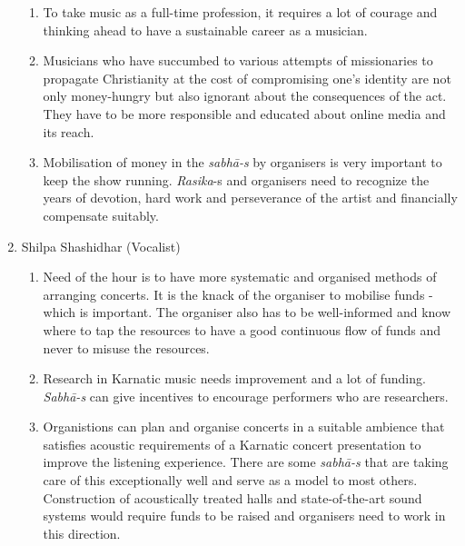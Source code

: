 \begin{enumerate}
\begin{enumerate}
 \item To take music as a full-time profession, it requires a lot of courage and thinking ahead to have a sustainable career as a musician.

 \item Musicians who have succumbed to various attempts of missionaries to propagate Christianity at the cost of compromising one’s identity are not only money-hungry but also ignorant about the consequences of the act. They have to be more responsible and educated about online media and its reach.

 \item Mobilisation of money in the \textit{sabhā-s} by organisers is very important to keep the show running. \textit{Rasika}-s and organisers need to recognize the years of devotion, hard work and perseverance of the artist and financially compensate suitably.
\end{enumerate}


 \item Shilpa Shashidhar (Vocalist)
 
\begin{enumerate}
\itemsep=0pt

 \item Need of the hour is to have more systematic and organised methods of arranging concerts. It is the knack of the organiser to mobilise funds - which is important. The organiser also has to be well-informed and know where to tap the resources to have a good continuous flow of funds and never to misuse the resources.

 \item Research in Karnatic music needs improvement and a lot of funding. \textit{Sabhā-s} can give incentives to encourage performers who are researchers.

 \item Organistions can plan and organise concerts in a suitable ambience that satisfies acoustic requirements of a Karnatic concert presentation to improve the listening experience. There are some \textit{sabhā-s} that are taking care of this exceptionally well and serve as a model to most others. Construction of acoustically treated halls and state-of-the-art sound systems would require funds to be raised and organisers need to work in this direction.
\end{enumerate}


\end{enumerate}

